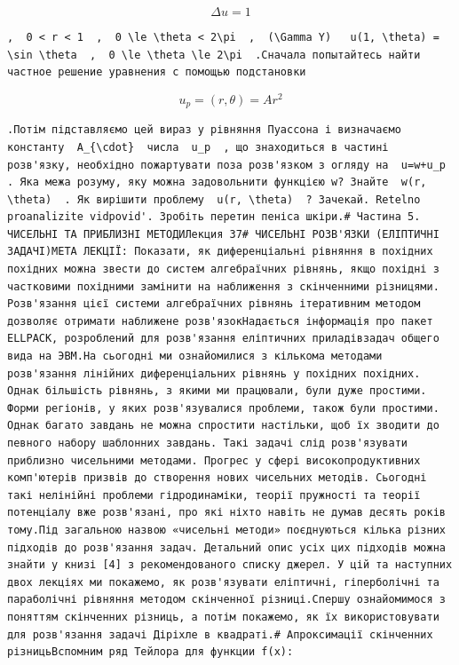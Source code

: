 \documentclass[
  ukrainian,
]{article}
\begin{document}
\[
\Delta u = 1
\]

\begin{verbatim}
,  0 < r < 1  ,  0 \le \theta < 2\pi  ,  (\Gamma Y)   u(1, \theta) = \sin \theta  ,  0 \le \theta \le 2\pi  .Сначала попытайтесь найти частное решение уравнения с помощью подстановки
\end{verbatim}

\[
u_p = (r, \theta) = Ar^2
\]

\begin{verbatim}
.Потім підставляємо цей вираз у рівняння Пуассона і визначаємо константу  A_{\cdot}  числа  u_p  , що знаходиться в частині розв'язку, необхідно пожартувати поза розв'язком з огляду на  u=w+u_p  . Яка межа розуму, яку можна задовольнити функцією w? Знайте  w(r, \theta)  . Як вирішити проблему  u(r, \theta)  ? Зачекай. Retelno proanalizite vidpovid'. Зробіть перетин пеніса шкіри.# Частина 5. ЧИСЕЛЬНІ ТА ПРИБЛИЗНІ МЕТОДИЛекция 37# ЧИСЕЛЬНІ РОЗВ'ЯЗКИ (ЕЛІПТИЧНІ ЗАДАЧІ)МЕТА ЛЕКЦІЇ: Показати, як диференціальні рівняння в похідних похідних можна звести до систем алгебраїчних рівнянь, якщо похідні з частковими похідними замінити на наближення з скінченними різницями. Розв'язання цієї системи алгебраїчних рівнянь ітеративним методом дозволяє отримати наближене розв'язокНадається інформація про пакет ELLPACK, розроблений для розв'язання еліптичних приладівзадач общего вида на ЭВМ.На сьогодні ми ознайомилися з кількома методами розв'язання лінійних диференціальних рівнянь у похідних похідних. Однак більшість рівнянь, з якими ми працювали, були дуже простими. Форми регіонів, у яких розв'язувалися проблеми, також були простими. Однак багато завдань не можна спростити настільки, щоб їх зводити до певного набору шаблонних завдань. Такі задачі слід розв'язувати приблизно чисельними методами. Прогрес у сфері високопродуктивних комп'ютерів призвів до створення нових чисельних методів. Сьогодні такі нелінійні проблеми гідродинаміки, теорії пружності та теорії потенціалу вже розв'язані, про які ніхто навіть не думав десять років тому.Під загальною назвою «чисельні методи» поєднуються кілька різних підходів до розв'язання задач. Детальний опис усіх цих підходів можна знайти у книзі [4] з рекомендованого списку джерел. У цій та наступних двох лекціях ми покажемо, як розв'язувати еліптичні, гіперболічні та параболічні рівняння методом скінченної різниці.Спершу ознайомимося з поняттям скінченних різниць, а потім покажемо, як їх використовувати для розв'язання задачі Діріхле в квадраті.# Апроксимації скінченних різницьВспомним ряд Тейлора для функции f(x):
\end{verbatim}
\end{document}
